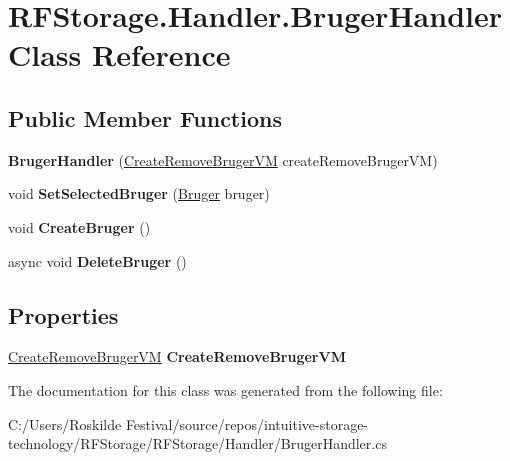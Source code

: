\hypertarget{class_r_f_storage_1_1_handler_1_1_bruger_handler}{}\section{R\+F\+Storage.\+Handler.\+Bruger\+Handler Class Reference}
\label{class_r_f_storage_1_1_handler_1_1_bruger_handler}
\subsection*{Public Member Functions}
\begin{DoxyCompactItemize}
\item 
\mbox{\label{class_r_f_storage_1_1_handler_1_1_bruger_handler_aa4940c3b376573afb7edf2e0c3e2f048}} 
{\bfseries Bruger\+Handler} (\mbox{\hyperlink{class_r_f_storage_1_1_view_model_1_1_create_remove_bruger_v_m}{Create\+Remove\+Bruger\+VM}} create\+Remove\+Bruger\+VM)
\item 
\mbox{\label{class_r_f_storage_1_1_handler_1_1_bruger_handler_a6192e7e5481d21d9e164a93cc967b09e}} 
void {\bfseries Set\+Selected\+Bruger} (\mbox{\hyperlink{class_r_f_storage_1_1_model_1_1_bruger}{Bruger}} bruger)
\item 
\mbox{\label{class_r_f_storage_1_1_handler_1_1_bruger_handler_a050383a5e38f0ea7fda367fedb3511b1}} 
void {\bfseries Create\+Bruger} ()
\item 
\mbox{\label{class_r_f_storage_1_1_handler_1_1_bruger_handler_a66a835f3553eb733ccc83366cfdbe077}} 
async void {\bfseries Delete\+Bruger} ()
\end{DoxyCompactItemize}
\subsection*{Properties}
\begin{DoxyCompactItemize}
\item 
\mbox{\label{class_r_f_storage_1_1_handler_1_1_bruger_handler_af06764b03c4e5322df07015c8c833e05}} 
\mbox{\hyperlink{class_r_f_storage_1_1_view_model_1_1_create_remove_bruger_v_m}{Create\+Remove\+Bruger\+VM}} {\bfseries Create\+Remove\+Bruger\+VM}
\end{DoxyCompactItemize}


The documentation for this class was generated from the following file\+:\begin{DoxyCompactItemize}
\item 
C\+:/\+Users/\+Roskilde Festival/source/repos/intuitive-\/storage-\/technology/\+R\+F\+Storage/\+R\+F\+Storage/\+Handler/Bruger\+Handler.\+cs\end{DoxyCompactItemize}
